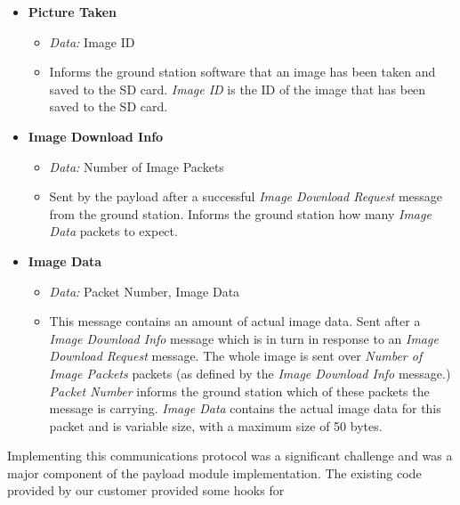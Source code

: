 \begin{itemize}

\item \textbf{Picture Taken}

\begin{itemize}
\item \emph{Data:} Image ID

\item Informs the ground station software that an image has been taken and 
saved to the SD card. \emph{Image ID} is the ID of the image that has been 
saved to the SD card.
\end{itemize} 

\item \textbf{Image Download Info}

\begin{itemize}

\item \emph{Data:} Number of Image Packets

\item Sent by the payload after a successful \emph{Image Download Request}
message from the ground station. Informs the ground station how many 
\emph{Image Data} packets to expect.
\end{itemize}

\item \textbf{Image Data} 
\begin{itemize}
\item \emph{Data:} Packet Number, Image Data
\item This message contains an amount of actual image data. Sent after a
\emph{Image Download Info} message which is in turn in response to an 
\emph{Image Download Request} message. The whole image is sent over
\emph{Number of Image Packets} packets (as defined by the \emph{Image Download
Info} message.) \emph{Packet Number} informs the ground station which of these
packets the message is carrying. \emph{Image Data} contains the actual image 
data for this packet and is variable size, with a maximum size of 50 bytes. 
\end{itemize}

\end{itemize}


Implementing this communications protocol was a significant challenge and was a major
component of the payload module implementation. The existing code provided by our 
customer provided some hooks for 

